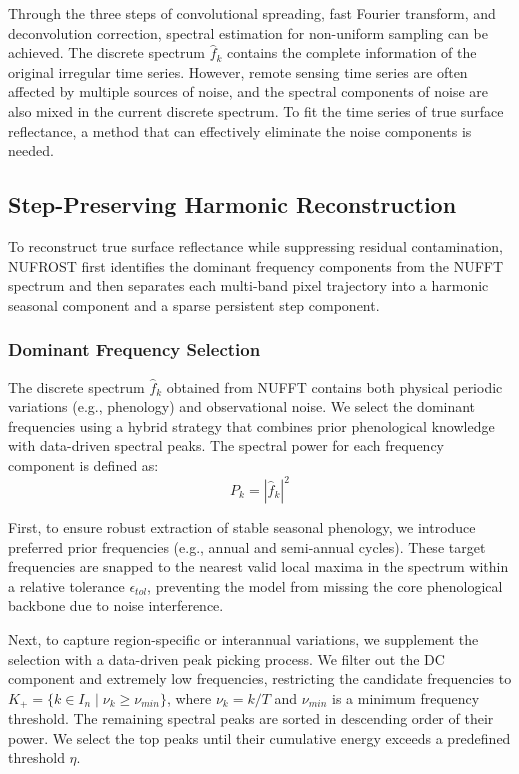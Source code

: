 \documentclass[letterpaper,journal]{IEEEtran}
\begin{document}
Through the three steps of convolutional spreading, fast Fourier transform, and deconvolution correction, spectral estimation for non-uniform sampling can be achieved. The discrete spectrum $\hat{f}_k$ contains the complete information of the original irregular time series. However, remote sensing time series are often affected by multiple sources of noise, and the spectral components of noise are also mixed in the current discrete spectrum. To fit the time series of true surface reflectance, a method that can effectively eliminate the noise components is needed.

\subsection{Step-Preserving Harmonic Reconstruction}

To reconstruct true surface reflectance while suppressing residual contamination, NUFROST first identifies the dominant frequency components from the NUFFT spectrum and then separates each multi-band pixel trajectory into a harmonic seasonal component and a sparse persistent step component.

\subsubsection{Dominant Frequency Selection}
The discrete spectrum $\hat{f}_k$ obtained from NUFFT contains both physical periodic variations (e.g., phenology) and observational noise. We select the dominant frequencies using a hybrid strategy that combines prior phenological knowledge with data-driven spectral peaks. The spectral power for each frequency component is defined as:
\begin{equation}
\label{eq:power}
P_k = \left|\hat{f}_k\right|^2
\end{equation}

First, to ensure robust extraction of stable seasonal phenology, we introduce preferred prior frequencies (e.g., annual and semi-annual cycles). These target frequencies are snapped to the nearest valid local maxima in the spectrum within a relative tolerance $\epsilon_{tol}$, preventing the model from missing the core phenological backbone due to noise interference.

Next, to capture region-specific or interannual variations, we supplement the selection with a data-driven peak picking process. We filter out the DC component and extremely low frequencies, restricting the candidate frequencies to $K_+ = \{k \in I_n \mid \nu_k \ge \nu_{min}\}$, where $\nu_k = k/T$ and $\nu_{min}$ is a minimum frequency threshold. The remaining spectral peaks are sorted in descending order of their power. We select the top peaks until their cumulative energy exceeds a predefined threshold $\eta$.
\end{document}
